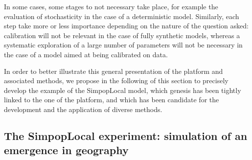\documentclass[10pt]{article}
\begin{document}
In some cases, some stages to not necessary take place, for example the evaluation of stochasticity in the case of a deterministic model. Similarly, each step take more or less importance depending on the nature of the question asked: calibration will not be relevant in the case of fully synthetic models, whereas a systematic exploration of a large number of parameters will not be necessary in the case of a model aimed at being calibrated on data.

In order to better illustrate this general presentation of the platform and associated methods, we propose in the following of this section to precisely develop the example of the SimpopLocal model, which genesis has been tightly linked to the one of the platform, and which has been candidate for the development and the application of diverse methods.


\subsection{The SimpopLocal experiment: simulation of an emergence in geography}
\end{document}
